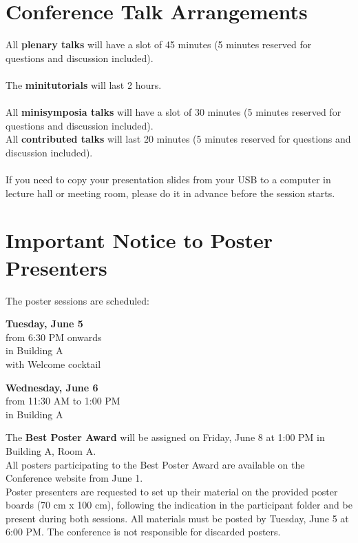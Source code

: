 
\section*{Conference Talk Arrangements}

All \textbf{plenary talks} will have a slot of 45 minutes
(5 minutes reserved for questions and discussion included).\\\\
The \textbf{minitutorials} will last 2 hours.\\\\
All \textbf{minisymposia talks} will have a slot of 30 minutes (5 minutes reserved for questions and discussion included).\\
All \textbf{contributed talks} will last 20 minutes (5 minutes reserved for questions and discussion included).\\\\
If you need to copy your presentation slides from your USB to a computer in lecture hall or meeting room, please do it in advance before
the session starts.

\section*{Important Notice to Poster Presenters}

The poster sessions are scheduled:
\begin{center}
  \textbf{Tuesday, June 5} \\
  from 6:30 PM onwards \\
  in Building A\\
  with Welcome cocktail

  \bigskip
   
  \textbf{Wednesday, June 6} \\
  from 11:30 AM to 1:00 PM \\
  in Building A
\end{center}

\noindent The \textbf{Best Poster Award} will be assigned on Friday, June 8 at 1:00 PM in Building A, Room A.\\
All posters participating to the Best Poster Award are available on the Conference website from June 1.\\
Poster presenters are requested to set up
their material on the provided poster boards (70 cm x 100 cm), following the indication in the participant folder and be present during both sessions.  
All materials must
be posted by Tuesday, June 5 at
6:00 PM.
The conference is not responsible for
discarded posters.

